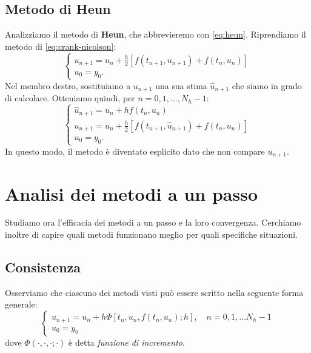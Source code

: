 \subsection{Metodo di Heun}
Analizziamo il metodo di \textbf{Heun}, che abbrevieremo con \eqref{eq:heun}.
Riprendiamo il metodo di \eqref{eq:crank-nicolson}:
\begin{equation*}\tag{CN}
\begin{cases}
u_{n+1} =u_{n} +\frac{h}{2}[ f( t_{n+1} ,u_{n+1}) +f( t_{n} ,u_{n})]\\
u_{0} =y_{0}.
\end{cases}
\end{equation*}
Nel membro destro, sostituiamo a $u_{n+1}$ una sua stima $\hat{u}_{n+1}$ che siamo in grado di calcolare.
Otteniamo quindi, per $n=0,1,\dotsc ,N_{h} -1$:
\begin{equation}\tag{H}
\begin{cases}
\hat{u}_{n+1} =u_{n} +hf( t_{n} ,u_{n})\\
u_{n+1} =u_{n} +\frac{h}{2}[ f( t_{n+1} ,\hat{u}_{n+1}) +f( t_{n} ,u_{n})]\\
u_{0} =y_{0}.
\end{cases}
\label{eq:heun}
\end{equation}
In questo modo, il metodo è diventato esplicito dato che non compare $u_{n+1}$.

\section{Analisi dei metodi a un passo}
Studiamo ora l'efficacia dei metodi a un passo e la loro convergenza.
Cerchiamo inoltre di capire quali metodi funzionano meglio per quali specifiche situazioni.

\subsection{Consistenza}
Osserviamo che ciascuno dei metodi visti può essere scritto nella seguente forma generale:
\begin{equation}
\begin{cases}
u_{n+1} =u_{n} +h\Phi [ t_{n} ,u_{n} ,f( t_{n} ,u_{n}) ;h] ,\quad n=0,1,\dotsc N_{h} -1\\
u_{0} =y_{0}
\end{cases}
\label{eq:forma-generale-1-passo}
\end{equation}
dove $\Phi ( \cdot ,\cdot ,\cdot ;\cdot )$ è detta \textit{funzione di incremento}.

